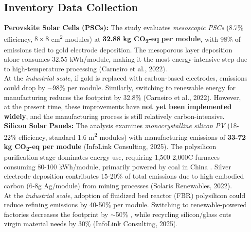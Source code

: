 \documentclass{article}
\begin{document}
\subsection{Inventory Data Collection}
\begin{tcolorbox}[title={\subsubsection{Manufacturing Phase}\vspace{-1em}}, colback=white, colframe=green!50!black, boxrule=0.4mm, width=1\textwidth]
\textcolor{green!50!black}{\textbf{Perovskite Solar Cells (PSCs):}} 
The study evaluates \textit{mesoscopic PSCs} (8.7\% efficiency, $8\times8$ cm\textsuperscript{2} modules) at \textbf{32.88 kg CO\textsubscript{2}-eq per module}, with 98\% of emissions tied to gold electrode deposition. The mesoporous layer deposition alone consumes 32.55 kWh/module, making it the most energy-intensive step due to high-temperature processing (Carneiro et al., 2022). \\[8pt]
At the \textit{industrial scale}, if gold is replaced with carbon-based electrodes, emissions could drop by $\sim$98\% per module. Similarly, switching to renewable energy for manufacturing reduces the footprint by 32.8\% (Carneiro et al., 2022). However, at the present time, these improvements have \textbf{not yet been implemented widely}, and the manufacturing process is still relatively carbon-intensive. \\[8pt]
\textcolor{green!50!black}{\textbf{Silicon Solar Panels:}} 
The analysis examines \textit{monocrystalline silicon PV} (18-22\% efficiency, standard 1.6 m\textsuperscript{2} modules) with manufacturing emissions of \textbf{33-72 kg CO\textsubscript{2}-eq per module} (InfoLink Consulting, 2025). The polysilicon purification stage dominates energy use, requiring 1,500-2,000\textdegree C furnaces consuming 80-100 kWh/module, primarily powered by coal in China . Silver electrode deposition contributes 15-20\% of total emissions due to high embodied carbon (6-8g Ag/module) from mining processes (Solaris Renewables, 2022). \\[8pt]
At the \textit{industrial scale}, adoption of fluidized bed reactor (FBR) polysilicon could reduce refining emissions by 40-50\% per module. Switching to renewable-powered factories decreases the footprint by $\sim$50\% , while recycling silicon/glass cuts virgin material needs by 30\% (InfoLink Consulting, 2025). \\[8pt]

\end{tcolorbox}
\end{document}
